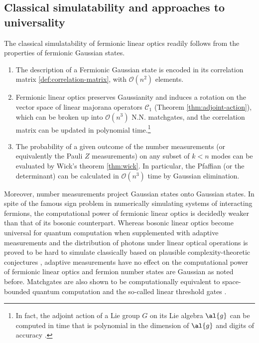 \subsection{Classical simulatability and approaches to universality}\label{ch5:classical-simulation}

The classical simulatability of fermionic linear optics readily follows from the properties of fermionic Gaussian states.
\begin{enumerate}
	\item The description of a Fermionic Gaussian state is encoded in its correlation matrix \eqref{def:correlation-matrix}, with $\mathcal{O}(n^2)$ elements.
	\item Fermionic linear optics preserves Gaussianity and induces a rotation on the vector space of linear majorana operators $\mathcal{C}_1$ (Theorem \ref{thm:adjoint-action}), which can be broken up into $\mathcal{O}(n^3)$ N.N. matchgates, and the correlation matrix can be updated in polynomial time.\footnote{In fact, the adjoint action of a Lie group $G$ on its Lie algebra $\al{g}$ can be computed in time that is polynomial in the dimension of $\al{g}$ and digits of accuracy \cite{somma_efficient_2006,jozsa_jordan-wigner_2015}.}
	\item The probability of a given outcome of the number measurements (or equivalently the Pauli $Z$ measurements) on any subset of $k<n$ modes can be evaluated by Wick's theorem \eqref{thm:wick}. In particular, the Pfaffian (or the determinant) can be calculated in $\mathcal{O}(n^3)$ time by Gaussian elimination.
\end{enumerate}

Moreover, number measurements project Gaussian states onto Gaussian states.
In spite of the famous sign problem in numerically simulating systems of interacting fermions, the computational power of fermionic linear optics is decidedly weaker than that of its bosonic counterpart. Whereas bosonic linear optics become universal for quantum computation when supplemented with adaptive measurements \cite{knill_scheme_2001} and the distribution of photons under linear optical operations is proved to be hard to simulate classically based on plausible complexity-theoretic conjectures \cite{aaronson_computational_2011}, adaptive measurements have no effect on the computational power of fermionic linear optics \cite{terhal_classical_2002} and fermion number states are Gaussian as noted before. Matchgates are also shown to be computationally equivalent to space-bounded quantum computation \cite{jozsa_matchgate_2010} and the so-called linear threshold gates \cite{nest_quantum_2011}.

